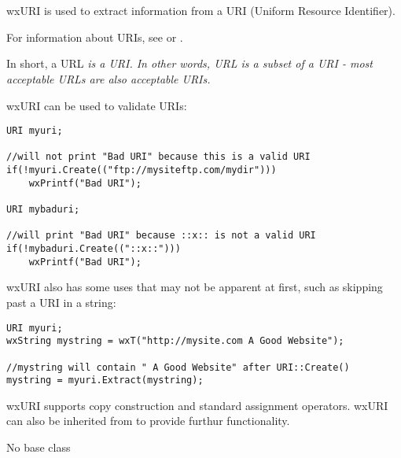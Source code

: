 
\section{}\label{wxuri}

wxURI is used to extract information from
a URI (Uniform Resource Identifier).

For information about URIs, see 
 or 
.

In short, a URL \em{is} a URI.  In other
words, URL is a subset of a URI - most 
acceptable URLs are also acceptable URIs.

wxURI can be used to validate URIs:
\begin{verbatim}
URI myuri;

//will not print "Bad URI" because this is a valid URI
if(!myuri.Create(("ftp://mysiteftp.com/mydir")))
	wxPrintf("Bad URI");

URI mybaduri;

//will print "Bad URI" because ::x:: is not a valid URI
if(!mybaduri.Create(("::x::")))
	wxPrintf("Bad URI");
\end{verbatim}

wxURI also has some uses that may not be apparent at first, 
such as skipping past a URI in a string:
\begin{verbatim}
URI myuri;
wxString mystring = wxT("http://mysite.com A Good Website");

//mystring will contain " A Good Website" after URI::Create()
mystring = myuri.Extract(mystring);
\end{verbatim}

wxURI supports copy construction and standard assignment
operators.  wxURI can also be inherited from to provide
furthur functionality.


No base class


